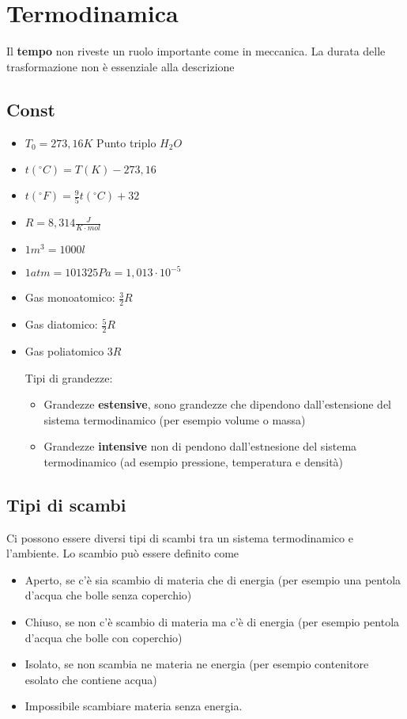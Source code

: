 \documentclass[a4paper]{report}
\begin{document}
  \chapter{Termodinamica}
  Il \textbf{tempo} non riveste un ruolo importante come in meccanica. La durata delle trasformazione non è essenziale alla descrizione

  \section{Const}
  \begin{itemize}
    \item $T_0 = 273,16 K$ Punto triplo $H_2O$
    \item $t(^\circ  C)= T(K) - 273,16$
    \item $t(^\circ  F)= \frac{9}{5} t(^\circ  C) + 32$
    \item $R = 8,314 \frac{J}{K \cdot mol}$
    \item $1 m^3 = 1000l$
    \item $1 atm = 101325Pa = 1,013 \cdot 10^{-5}$
    \item Gas monoatomico: $\frac{3}{2}R$
    \item Gas diatomico: $\frac{5}{2}R$
    \item Gas poliatomico $3 R$

    Tipi di grandezze:
    \begin{itemize}
      \item Grandezze \textbf{estensive}, sono grandezze che dipendono dall'estensione del sistema termodinamico (per esempio volume o massa)
      \item Grandezze \textbf{intensive} non di pendono dall'estnesione del sistema termodinamico (ad esempio pressione, temperatura e densità)
    \end{itemize}
  \end{itemize}

  \section{Tipi di scambi}
  Ci possono essere diversi tipi di scambi tra un sistema termodinamico e l'ambiente. Lo scambio può essere definito come
  \begin{itemize}
    \item Aperto, se c'è sia scambio di materia che di energia (per esempio una pentola d'acqua che bolle senza coperchio)
    \item Chiuso, se non c'è scambio di materia ma c'è di energia (per esempio pentola d'acqua che bolle con coperchio)
    \item Isolato, se non scambia ne materia ne energia (per esempio contenitore esolato che contiene acqua)
    \item Impossibile scambiare materia senza energia.
  \end{itemize}
\end{document}
